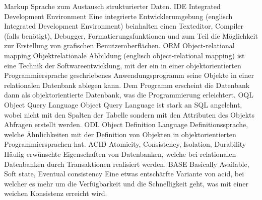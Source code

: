   {Markup Sprache zum Austausch strukturierter Daten.}
  {IDE}               %
  {Integrated Development Environment}  %
  {Eine integrierte Entwicklerumgebung (englisch Integrated Development Environment) beinhalten einen Texteditor, 
Compiler (falls benötigt), Debugger, Formatierungsfunktionen und zum Teil die Möglichkeit zur Erstellung von grafischen 
Benutzeroberflächen.}
  {ORM}               %
  {Object-relational mapping}  %
  {Objektrelationale Abbildung (englisch object-relational mapping) ist eine Technik der Softwareentwicklung, mit der ein in einer 
objektorientierten Programmiersprache geschriebenes Anwendungsprogramm seine Objekte in einer relationalen Datenbank ablegen 
kann. Dem Programm erscheint die Datenbank dann als objektorientierte Datenbank, was die Programmierung erleichtert. 
\cite{wiki_orm}}
  {OQL}               %
  {Object Query Language}  %
  {Object Query Language ist stark an SQL angelehnt, wobei nicht mit den Spalten der Tabelle sondern mit den Attributen des Objekts 
Abfragen erstellt werden.}
  {ODL}               %
  {Object Definition Language}  %
  {Definitionssprache, welche Ähnlichkeiten mit der Definition von Objekten in objektorientierten Programmiersprachen hat.}
  {ACID}               %
  {Atomicity, Consistency, Isolation, Durability}  %
  {Häufig erwünschte Eigenschaften von Datenbanken, welche bei relationalen Datenbanken durch Transaktionen realisiert werden.}
  {BASE}               %
  {Basically Available, Soft state, Eventual consistency}  %
  {Eine etwas entschärfte Variante von \gls{acid}, bei welcher es mehr um die Verfügbarkeit und die Schnelligkeit geht, was mit einer 
weichen Konsistenz erreicht wird.}

